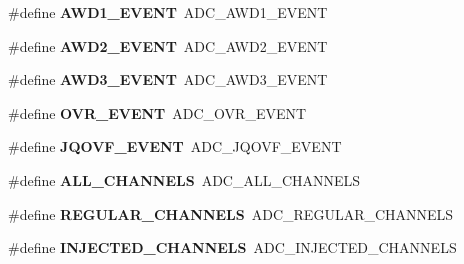 \begin{DoxyCompactItemize}
\item 
\mbox{\label{group___h_a_l___a_d_c___aliased___defines_ga1429af679941d537c64f7004430fdf54}} 
\#define {\bfseries A\+W\+D1\+\_\+\+E\+V\+E\+NT}~A\+D\+C\+\_\+\+A\+W\+D1\+\_\+\+E\+V\+E\+NT
\item 
\mbox{\label{group___h_a_l___a_d_c___aliased___defines_ga04d97e3fb4776a8fae622cf88b442687}} 
\#define {\bfseries A\+W\+D2\+\_\+\+E\+V\+E\+NT}~A\+D\+C\+\_\+\+A\+W\+D2\+\_\+\+E\+V\+E\+NT
\item 
\mbox{\label{group___h_a_l___a_d_c___aliased___defines_gabb3f690eef894c37c3f2c49e1d8c6c06}} 
\#define {\bfseries A\+W\+D3\+\_\+\+E\+V\+E\+NT}~A\+D\+C\+\_\+\+A\+W\+D3\+\_\+\+E\+V\+E\+NT
\item 
\mbox{\label{group___h_a_l___a_d_c___aliased___defines_gaf63a166dce844ba44197109fe3a3d02f}} 
\#define {\bfseries O\+V\+R\+\_\+\+E\+V\+E\+NT}~A\+D\+C\+\_\+\+O\+V\+R\+\_\+\+E\+V\+E\+NT
\item 
\mbox{\label{group___h_a_l___a_d_c___aliased___defines_gae63ff704e73ca97890da8a07e141bb96}} 
\#define {\bfseries J\+Q\+O\+V\+F\+\_\+\+E\+V\+E\+NT}~A\+D\+C\+\_\+\+J\+Q\+O\+V\+F\+\_\+\+E\+V\+E\+NT
\item 
\mbox{\label{group___h_a_l___a_d_c___aliased___defines_gac9dcdba2096f6b3adab742b8b1a256c2}} 
\#define {\bfseries A\+L\+L\+\_\+\+C\+H\+A\+N\+N\+E\+LS}~A\+D\+C\+\_\+\+A\+L\+L\+\_\+\+C\+H\+A\+N\+N\+E\+LS
\item 
\mbox{\label{group___h_a_l___a_d_c___aliased___defines_ga9480bc25f45fc189111dba13103c404e}} 
\#define {\bfseries R\+E\+G\+U\+L\+A\+R\+\_\+\+C\+H\+A\+N\+N\+E\+LS}~A\+D\+C\+\_\+\+R\+E\+G\+U\+L\+A\+R\+\_\+\+C\+H\+A\+N\+N\+E\+LS
\item 
\mbox{\label{group___h_a_l___a_d_c___aliased___defines_ga458eefd477e1e06e313716de162b7d0f}} 
\#define {\bfseries I\+N\+J\+E\+C\+T\+E\+D\+\_\+\+C\+H\+A\+N\+N\+E\+LS}~A\+D\+C\+\_\+\+I\+N\+J\+E\+C\+T\+E\+D\+\_\+\+C\+H\+A\+N\+N\+E\+LS

\end{DoxyCompactItemize}
